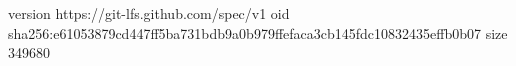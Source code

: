 version https://git-lfs.github.com/spec/v1
oid sha256:e61053879cd447ff5ba731bdb9a0b979ffefaca3cb145fdc10832435effb0b07
size 349680
